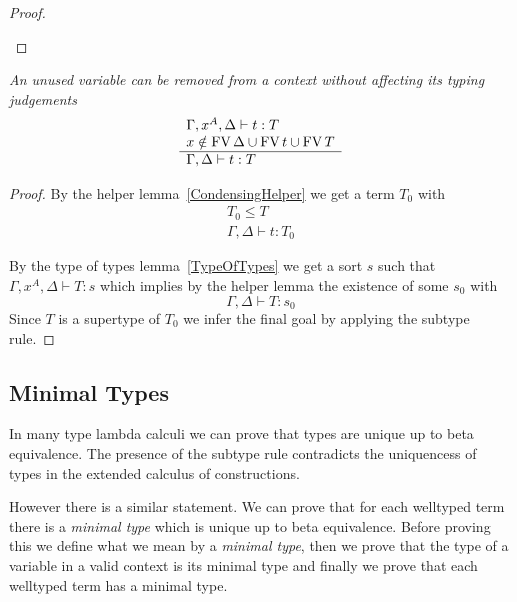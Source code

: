 \begin{lemma}
\begin{proof}
{\begin{enumerate}
\begin{enumerate}
            \end{enumerate}
        \end{enumerate}
        }
    \end{proof}
\end{lemma}



\begin{lemma}
    \label{Condensing}
    \emph{An unused variable can be removed from a context without affecting its
    typing judgements}
    $$
    \begin{array}{l} 
        \Gamma,x^A,\Delta \vdash t: T
        \\
        x \notin \text{FV}\, \Delta \cup \text{FV}\, t \cup \text{FV}\, T
     \\ \hline 
        \Gamma, \Delta \vdash t : T
    \end{array}
    $$

    \begin{proof}
        By the helper lemma~\ref{CondensingHelper} we get a term $T_0$ with
        $$
        \begin{array}{l}
            T_0 \le T
            \\
            \Gamma,\Delta \vdash t : T_0
        \end{array}
        $$

        By the type of types lemma~\ref{TypeOfTypes} we get a sort $s$ such that
        $\Gamma,x^A,\Delta \vdash T : s$ which implies by the helper lemma the
        existence of some $s_0$ with
        $$
        \Gamma,\Delta \vdash T : s_0
        $$
        Since $T$ is a supertype of $T_0$ we infer the final goal by applying
        the subtype rule.
    \end{proof}
\end{lemma}






\subsection{Minimal Types}

In many type lambda calculi we can prove that types are unique up to beta
equivalence. The presence of the subtype rule contradicts the uniquencess of
types in the extended calculus of constructions.

However there is a similar statement. We can prove that for each welltyped term
there is a \emph{minimal type} which is unique up to beta equivalence. Before
proving this we define what we mean by a \emph{minimal type}, then we prove that
the type of a variable in a valid context is its minimal type and finally we
prove that each welltyped term has a minimal type.


